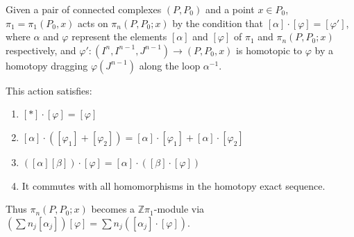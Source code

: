 Given a pair of connected complexes $(P, P_0)$ and a point $x \in P_0$, $\pi_1 = \pi_1(P_0, x)$ acts on $\pi_n(P, P_0; x)$ by the condition that $[\alpha] \cdot [\varphi] = [\varphi']$, where $\alpha$ and $\varphi$ represent the elements $[\alpha]$ and $[\varphi]$ of $\pi_1$ and $\pi_n(P, P_0; x)$ respectively, and $\varphi': (I^n, I^{n-1}, J^{n-1}) \to (P, P_0, x)$ is homotopic to $\varphi$ by a homotopy dragging $\varphi(J^{n-1})$ along the loop $\alpha^{-1}$.

This action satisfies:
\begin{enumerate}
\item[(0)] $[*] \cdot [\varphi] = [\varphi]$
\item[(1)] $[\alpha] \cdot ([\varphi_1] + [\varphi_2]) = [\alpha] \cdot [\varphi_1] + [\alpha] \cdot [\varphi_2]$
\item[(2)] $([\alpha][\beta]) \cdot [\varphi] = [\alpha] \cdot ([\beta] \cdot [\varphi])$
\item[(3)] It commutes with all homomorphisms in the homotopy exact sequence.
\end{enumerate}
Thus $\pi_n(P, P_0; x)$ becomes a $\mathbb{Z}\pi_1$-module via $\left(\sum n_j [\alpha_j]\right)[\varphi] = \sum n_j ([\alpha_j] \cdot [\varphi])$.

